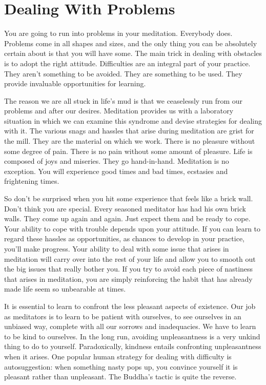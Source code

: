 \chapter{Dealing With Problems}

You are going to run into problems in your
meditation. Everybody does. Problems come in all shapes and sizes, and the only
thing you can be absolutely certain about is that you will have some. The main
trick in dealing with obstacles is to adopt the right attitude. Difficulties are
an integral part of your practice. They aren't something to be avoided. They are
something to be used. They provide invaluable opportunities for learning.

The reason we are all stuck in life's mud is that we ceaselessly run from our
problems and after our desires. Meditation provides us with a laboratory
situation in which we can examine this syndrome and devise strategies for
dealing with it. The various snags and hassles that arise during meditation are
grist for the mill. They are the material on which we work. There is no pleasure
without some degree of pain. There is no pain without some amount of pleasure.
Life is composed of joys and miseries. They go hand-in-hand. Meditation is no
exception. You will experience good times and bad times, ecstasies and
frightening times.

So don't be surprised when you hit some experience that feels like a brick wall.
Don't think you are special. Every seasoned meditator has had his own brick
walls. They come up again and again. Just expect them and be ready to cope. Your
ability to cope with trouble depends upon your attitude. If you can learn to
regard these hassles as opportunities, as chances to develop in your practice,
you'll make progress. Your ability to deal with some issue that arises in
meditation will carry over into the rest of your life and allow you to smooth
out the big issues that really bother you. If you try to avoid each piece of
nastiness that arises in meditation, you are simply reinforcing the habit that
has already made life seem so unbearable at times.

It is essential to learn to confront the less pleasant aspects of existence. Our
job as meditators is to learn to be patient with ourselves, to see ourselves in
an unbiased way, complete with all our sorrows and inadequacies. We have to
learn to be kind to ourselves. In the long run, avoiding unpleasantness is a
very unkind thing to do to yourself. Paradoxically, kindness entails confronting
unpleasantness when it arises. One popular human strategy for dealing with
difficulty is autosuggestion: when something nasty pops up, you convince
yourself it is pleasant rather than unpleasant. The Buddha's tactic is quite the
reverse.

